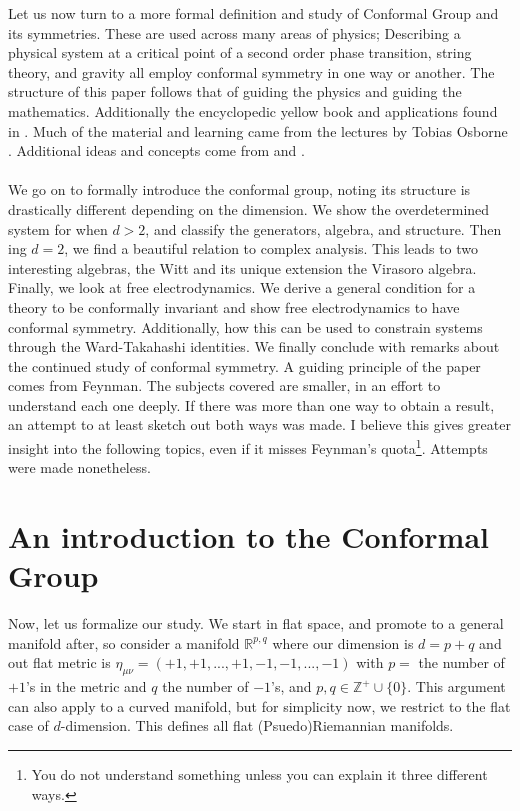 \documentclass{article}
\begin{document}
Let us now turn to a more formal definition and study of Conformal Group and its symmetries. These are used across many areas of physics; Describing a physical system at a critical point of a second order phase transition, string theory, and gravity all employ conformal symmetry in one way or another. The structure of this paper follows that of \cite{ginsparg1988} guiding the physics and \cite{schottenloher2008} guiding the mathematics. Additionally the encyclopedic yellow book \cite{difrancesco1997} and applications found in \cite{polchinski1998}. Much of the material and learning came from the  lectures by Tobias Osborne \cite{osbornelectures}. Additional ideas and concepts come from \cite{nakayama2014} and \cite{Schellekens:1996tg}. \\\\
We go on to formally introduce the conformal group, noting its structure is drastically different depending on the dimension. We show the overdetermined system for when $d>2$, and classify the generators, algebra, and structure. Then ing $d = 2$, we find a beautiful relation to complex analysis. This leads to two interesting algebras, the Witt and its unique extension the Virasoro algebra. Finally, we look at free electrodynamics. We derive a general condition for a theory to be conformally invariant and show free electrodynamics to have conformal symmetry. Additionally, how this can be used to constrain systems through the Ward-Takahashi identities. We finally conclude with remarks about the continued study of conformal symmetry. A guiding principle of the paper comes from Feynman. The subjects covered are smaller, in an effort to understand each one deeply. If there was more than one way to obtain a result, an attempt to at least sketch out both ways was made. I believe this gives greater insight into the following topics, even if it misses Feynman's quota\footnote{You do not understand something unless you can explain it three different ways.}. Attempts were made nonetheless.  



\section{An introduction to the Conformal Group}
Now, let us formalize our study. We start in flat space, and promote to a general manifold after, so consider a manifold $\mathds{R}^{p,q}$ where our dimension is $d = p+q$ and out flat metric is $\eta_{\mu\nu} = (+1,+1,...,+1,-1,-1,...,-1)$ with $p = $ the number of $+1$'s in the metric and $q$ the number of $-1$'s, and $p,q \in \mathds{Z}^+\cup \{0\}$. This argument can also apply to a curved manifold, but for simplicity now, we restrict to the flat case of $d$-dimension. This defines all flat (Psuedo)Riemannian manifolds. 
\end{document}
